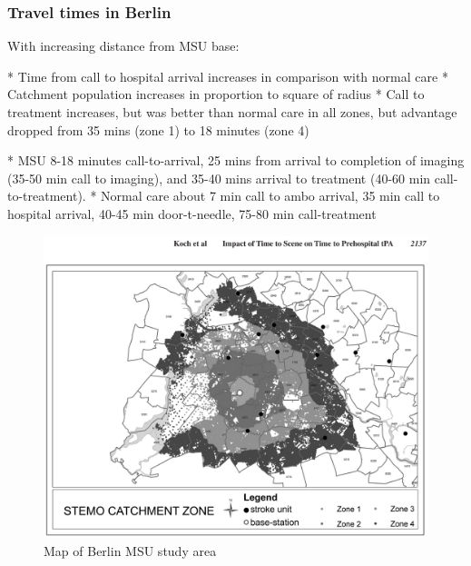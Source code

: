 \subsubsection{Travel times in Berlin \cite{koch_influence_2016}}

With increasing distance from MSU base:

* Time from call to hospital arrival increases in comparison with normal care
* Catchment population increases in proportion to square of radius
* Call to treatment increases, but was better than normal care in all zones, but advantage dropped from 35 mins (zone 1) to 18 minutes (zone 4)

* MSU 8-18 minutes call-to-arrival, 25 mins from arrival to completion of imaging (35-50 min call to imaging), and 35-40 mins arrival to treatment (40-60 min call-to-treatment).
* Normal care about 7 min call to ambo arrival, 35 min call to hospital arrival, 40-45 min door-t-needle, 75-80 min call-treatment


\begin{figure}
    \centering
    \includegraphics[width=0.9\linewidth]{images_background/berlin_map_2.png}
    \caption{Map of Berlin MSU study area }
    \label{fig:map_berlin_2}
\end{figure}

